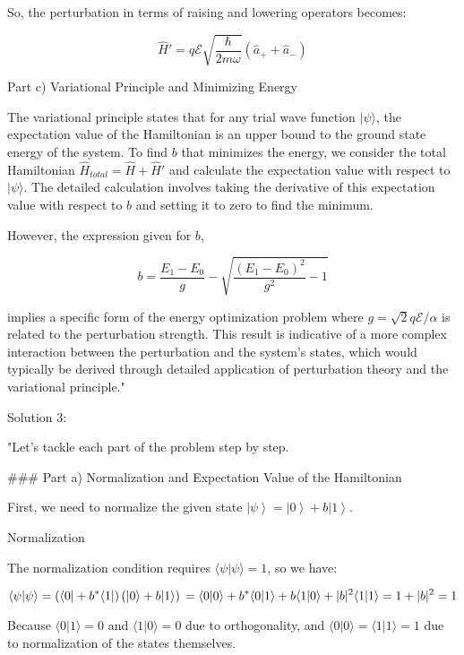 So, the perturbation in terms of raising and lowering operators becomes:

\[
\hat{H}' = q \mathcal{E} \sqrt{\frac{\hbar}{2m\omega}}(\hat{a}_+ + \hat{a}_-)
\]

Part c) Variational Principle and Minimizing Energy

The variational principle states that for any trial wave function \( | \psi \rangle \), the expectation value of the Hamiltonian is an upper bound to the ground state energy of the system. To find \( b \) that minimizes the energy, we consider the total Hamiltonian \( \hat{H}_{total} = \hat{H} + \hat{H}' \) and calculate the expectation value with respect to \( | \psi \rangle \). The detailed calculation involves taking the derivative of this expectation value with respect to \( b \) and setting it to zero to find the minimum.

However, the expression given for \( b \),

\[
b = \frac{E_{1} - E_{0}}{g} - \sqrt{\frac{(E_{1} - E_{0})^{2}}{g^{2}} -1}
\]

implies a specific form of the energy optimization problem where \( g = \sqrt{2} q \mathcal{E} / {\alpha} \) is related to the perturbation strength. This result is indicative of a more complex interaction between the perturbation and the system's states, which would typically be derived through detailed application of perturbation theory and the variational principle."

Solution 3:

"Let's tackle each part of the problem step by step.

### Part a) Normalization and Expectation Value of the Hamiltonian

First, we need to normalize the given state \( \left| \psi \right> = \left| 0 \right> + b \left| 1 \right> \).

Normalization

The normalization condition requires \( \langle \psi | \psi \rangle = 1 \), so we have:

\[
\langle \psi | \psi \rangle = \left( \langle 0 | + b^* \langle 1 | \right) \left( | 0 \rangle + b | 1 \rangle \right) \\
= \langle 0 | 0 \rangle + b^* \langle 0 | 1 \rangle + b \langle 1 | 0 \rangle + |b|^2 \langle 1 | 1 \rangle \\
= 1 + |b|^2 = 1
\]

Because \( \langle 0 | 1 \rangle = 0 \) and \( \langle 1 | 0 \rangle = 0 \) due to orthogonality, and \( \langle 0 | 0 \rangle = \langle 1 | 1 \rangle = 1 \) due to normalization of the states themselves.

